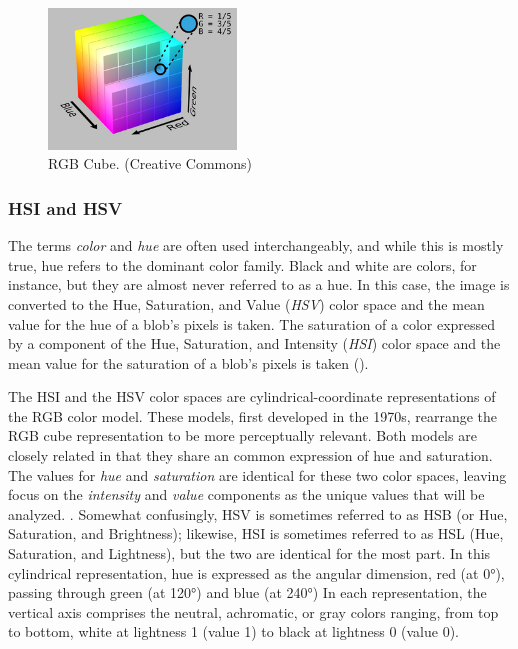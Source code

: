 \documentclass[letterpaper, notitlepage]{report}
\begin{document}
{%
%
\begin{figure}[H]
	\centering
	\includegraphics[width=5cm]{./figures/RGB_Cube_Show_lowgamma_cutout_b.png}
	\caption[RGB Cube]{RGB Cube. (Creative Commons)}
	\label{fig:rgb-cube}
\end{figure}

\subsubsection{HSI and HSV}
The terms {\it color} and {\it hue} are often used interchangeably, and while this is mostly true, hue refers to the dominant color family. Black and white are colors, for instance, but they are almost never referred to as a hue. In this case, the image is converted to the Hue, Saturation, and Value ({\it HSV}) color space and the mean value for the hue of a blob's pixels is taken. The saturation of a color expressed by a component of the Hue, Saturation, and Intensity ({\it HSI}) color space and the mean value for the saturation of a blob's pixels is taken (\cite{Forsyth2012-hy}).

The \gls{HSI} and the \gls{HSV} color spaces are cylindrical-coordinate representations of the RGB color model.  These models, first developed in the 1970s, rearrange the RGB cube representation to be more perceptually relevant. Both models are closely related in that they share an common expression of hue and saturation. The values for \textit{hue} and \textit{saturation} are identical for these two color spaces, leaving focus on the \textit{intensity} and \textit{value} components as the unique values that will be analyzed. \parencite[p.~84]{Forsyth2012-hy}. Somewhat confusingly, HSV is sometimes referred to as HSB (or Hue, Saturation, and Brightness); likewise, HSI is sometimes referred to as HSL (Hue, Saturation, and Lightness), but the two are identical for the most part. In this cylindrical representation, hue is expressed as the angular dimension, red (at 0\si{\degree}), passing through green (at 120\si{\degree}) and blue (at 240\si{\degree}) In each representation, the vertical axis comprises the neutral, achromatic, or gray colors ranging, from top to bottom, white at lightness 1 (value 1) to black at lightness 0 (value 0).

}
\end{document}
